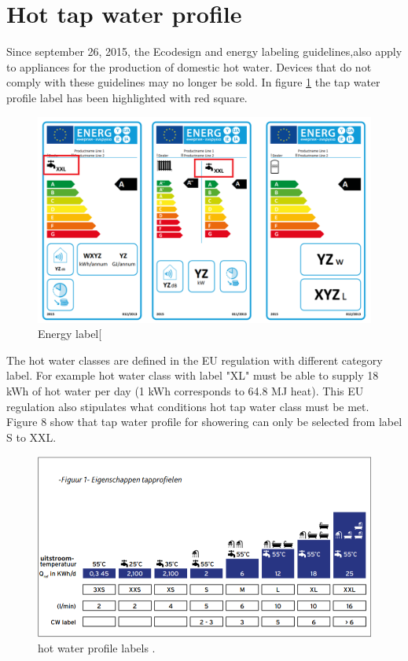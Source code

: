 \section{Hot tap water profile}

	
Since september 26, 2015, the Ecodesign \cite{Ecodesign} and energy labeling guidelines,also apply to appliances for the production of domestic hot water. 
Devices that do not comply with these guidelines may no longer be sold. In figure \ref{fig:energylabel} the tap water profile label has been highlighted with red square.\\
	
	
\begin{figure}[H]
	\centering
	\includegraphics[width=1\columnwidth]{pictures/energy label.png}
	\caption[Short title]{Energy label[ \cite{Ecodesign}}
	\label{fig:energylabel}
\end{figure}

The hot water classes are defined in the EU regulation with different category label. For example hot water class with label "XL" must be able to supply 18 kWh of hot water per day (1 kWh corresponds to 64.8 MJ heat). This EU regulation also stipulates what conditions hot tap water class must be met.
Figure 8 show that tap water profile for showering can only be selected from label S to XXL.
	
\begin{figure}[ht]
	\centering
	\includegraphics[width=1\columnwidth]{pictures/tap profile.png}
	\caption[Short title]{hot water profile labels \cite{Ecodesign}.}
	\label{fig:profilelabels}
\end{figure}
	

